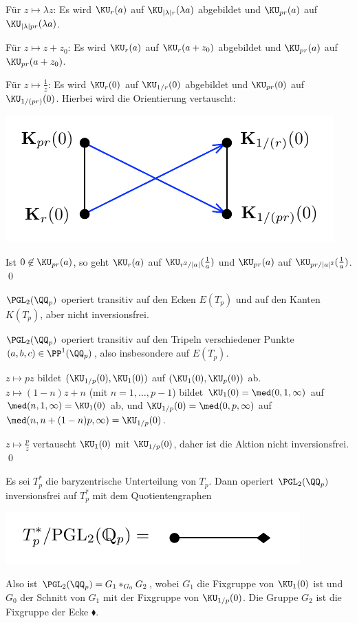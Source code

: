 \begin{itemize}
Für $z\mapsto \lambda z$: Es wird $\KU_r(a)$ auf
$\KU_{|\lambda|r}(\lambda a)$ abgebildet und $\KU_{pr}(a)$ auf
$\KU_{|\lambda|pr}(\lambda a)$.

Für $z\mapsto z+z_0$: Es wird $\KU_r(a)$ auf $\KU_r(a+z_0)$
abgebildet und $\KU_{pr}(a)$ auf $\KU_{pr}(a+z_0)$.

Für $z\mapsto\frac{1}{z}$: Es wird $\KU_r(0)$ auf
$\KU_{1/r}(0)$ abgebildet und $\KU_{pr}(0)$ auf
$\KU_{1/(pr)}(0)$. Hierbei wird die Orientierung vertauscht:
\begin{center}
	\includegraphics{grugraImages/vertauscht}
\end{center}
Ist $0\not\in \KU_{pr}(a)$, so geht $\KU_{r}(a)$ auf
$\KU_{r^2/|a|}(\frac{1}{a})$ und $\KU_{pr}(a)$ auf
$\KU_{pr/|a|^2}(\frac{1}{a})$.
\qed
\end{itemize}

\BEM $\PGL_2(\QQ_p)$ operiert transitiv auf den Ecken $E(T_p)$
und auf den Kanten $K(T_p)$, aber nicht inversionsfrei.

\bew $\PGL_2(\QQ_p)$ operiert transitiv auf den Tripeln verschiedener
Punkte $(a,b,c)\in\PP^1(\QQ_p)$, also insbesondere auf $E(T_p)$.

$z\mapsto pz$ bildet $(\KU_{1/p}(0),\KU_1(0))$ auf
$(\KU_1(0),\KU_p(0))$ ab.\\
$z\mapsto (1-n)z+n$ (mit $n=1,\ldots,p-1$) bildet
$\KU_1(0)=\med(0,1,\infty)$ auf $\med(n,1,\infty)=\KU_1(0)$ ab,
und $\KU_{1/p}(0)=\med(0,p,\infty)$ auf $\med(n,n+(1-n)p,\infty)
=\KU_{1/p}(0)$.

$z\mapsto \frac{p}{z}$ vertauscht $\KU_1(0)$ mit $\KU_{1/p}(0)$,
daher ist die Aktion nicht inversionsfrei.
\qed

\FOLG Es sei $T_p^*$ die baryzentrische Unterteilung von $T_p$.
Dann operiert $\PGL_2(\QQ_p)$ inversionsfrei auf $T_p^*$ mit dem
Quotientengraphen
\begin{center}
	\includegraphics{grugraImages/pglQuotient}
\end{center}
Also ist $\PGL_2(\QQ_p) = G_1 *_{G_0} G_2$, wobei $G_1$ die Fixgruppe
von $\KU_1(0)$ ist und $G_0$ der Schnitt von $G_1$ mit
der Fixgruppe
von $\KU_{1/p}(0)$. Die Gruppe $G_2$ ist die Fixgruppe der Ecke
$\blacklozenge$.

